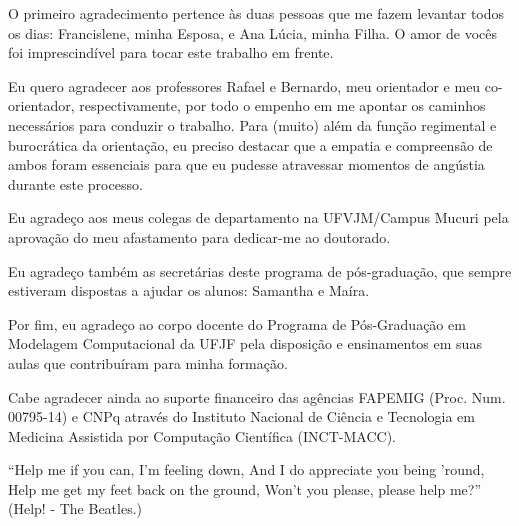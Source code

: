 \documentclass[
  openright,
  english,
  brazil
]{abntbibufjf}
\begin{document}
\begin{agradecimentos}

O primeiro agradecimento pertence às duas pessoas que me fazem 
levantar todos os dias: Francislene, minha Esposa, e Ana Lúcia, minha Filha.
O amor de vocês foi imprescindível para tocar este trabalho em frente.

Eu quero agradecer aos professores Rafael e Bernardo, meu orientador e meu
co-orientador, respectivamente, por todo o empenho 
em me apontar os caminhos necessários para conduzir o trabalho. Para (muito) além da 
função regimental e burocrática da orientação, eu preciso destacar que 
a empatia e compreensão de ambos foram essenciais para que eu pudesse atravessar 
momentos de angústia durante este processo.

Eu agradeço aos meus colegas de departamento na UFVJM/Campus Mucuri pela aprovação do meu 
afastamento para dedicar-me ao doutorado.

Eu agradeço também as secretárias deste programa de pós-graduação, que sempre 
estiveram dispostas a ajudar os alunos: Samantha e Maíra.

Por fim, eu agradeço ao corpo docente do Programa de Pós-Graduação em Modelagem Computacional da UFJF 
pela disposição e ensinamentos em suas aulas que contribuíram para minha formação.

Cabe agradecer ainda ao suporte financeiro das agências FAPEMIG (Proc. Num. 00795-14) e 
CNPq através do Instituto Nacional de Ciência e Tecnologia em Medicina Assistida por Computação 
Científica (INCT-MACC).

\end{agradecimentos}

\begin{epigrafemais}

    ``Help me if you can, I'm feeling down,\newline
    And I do appreciate you being 'round,\newline
    Help me get my feet back on the ground,\newline
    Won't you please, please help me?''\newline\newline
    (Help! - The Beatles.)

\end{epigrafemais}
\end{document}
